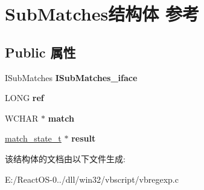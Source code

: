 \hypertarget{struct_sub_matches}{}\section{Sub\+Matches结构体 参考}
\label{struct_sub_matches}
\subsection*{Public 属性}
\begin{DoxyCompactItemize}
\item 
\mbox{\label{struct_sub_matches_a02e219561ab9331c890277031834b81a}} 
I\+Sub\+Matches {\bfseries I\+Sub\+Matches\+\_\+iface}
\item 
\mbox{\label{struct_sub_matches_ac0d8ac3a0576e4a579fa159120341d89}} 
L\+O\+NG {\bfseries ref}
\item 
\mbox{\label{struct_sub_matches_ad8b9f23b9dd6d38cc36ac6b95ce6579a}} 
W\+C\+H\+AR $\ast$ {\bfseries match}
\item 
\mbox{\label{struct_sub_matches_a41f4cc9a484045429758e486f80d5bd0}} 
\hyperlink{structmatch__state__t}{match\+\_\+state\+\_\+t} $\ast$ {\bfseries result}
\end{DoxyCompactItemize}


该结构体的文档由以下文件生成\+:\begin{DoxyCompactItemize}
\item 
E\+:/\+React\+O\+S-\/0../dll/win32/vbscript/vbregexp.\+c\end{DoxyCompactItemize}
